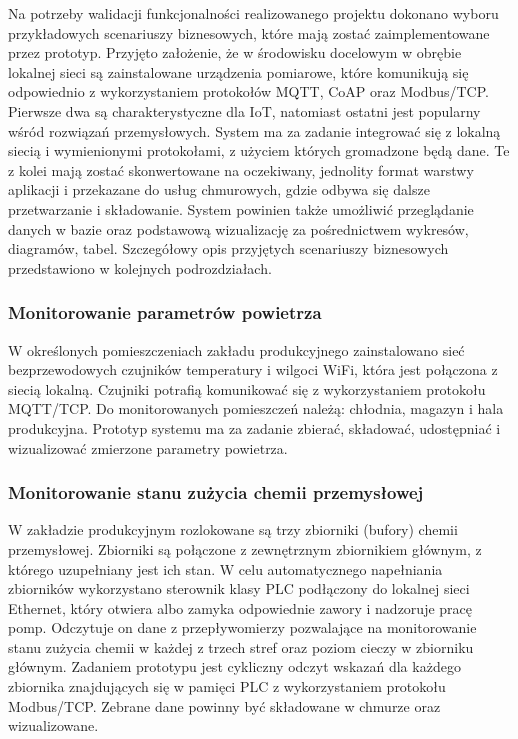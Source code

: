 \documentclass[a4paper, 12pt, twoside]{article}
\begin{document}
Na potrzeby walidacji funkcjonalności realizowanego projektu dokonano wyboru przykładowych
scenariuszy biznesowych, które mają zostać zaimplementowane przez prototyp.
Przyjęto założenie, że w środowisku docelowym w obrębie lokalnej sieci
są zainstalowane urządzenia pomiarowe, które komunikują się odpowiednio
z wykorzystaniem protokołów
MQTT, CoAP oraz Modbus/TCP. Pierwsze dwa są charakterystyczne dla IoT, natomiast
ostatni jest popularny wśród rozwiązań przemysłowych. System ma za zadanie
integrować się z lokalną siecią i wymienionymi protokołami, z użyciem
których gromadzone będą dane. Te z kolei mają zostać skonwertowane na oczekiwany,
jednolity format warstwy aplikacji i przekazane do usług chmurowych, gdzie odbywa się dalsze
przetwarzanie i składowanie. System powinien także umożliwić przeglądanie danych
w bazie oraz podstawową wizualizację za pośrednictwem wykresów, diagramów, tabel.
Szczegółowy opis przyjętych scenariuszy biznesowych przedstawiono w kolejnych
podrozdziałach.

\subsubsection{Monitorowanie parametrów powietrza}

W określonych pomieszczeniach zakładu produkcyjnego zainstalowano sieć bezprzewodowych
czujników temperatury i wilgoci WiFi, która jest połączona z siecią lokalną.
Czujniki potrafią komunikować się z wykorzystaniem protokołu MQTT/TCP. Do monitorowanych
pomieszczeń należą: chłodnia, magazyn i hala produkcyjna. Prototyp systemu ma za zadanie
zbierać, składować, udostępniać i wizualizować zmierzone parametry powietrza.

\subsubsection{Monitorowanie stanu zużycia chemii przemysłowej}

W zakładzie produkcyjnym rozlokowane są trzy zbiorniki (bufory) chemii przemysłowej.
Zbiorniki są połączone z zewnętrznym zbiornikiem głównym, z którego uzupełniany
jest ich stan. W celu automatycznego napełniania zbiorników wykorzystano sterownik
klasy PLC podłączony do lokalnej sieci Ethernet, który otwiera albo zamyka
odpowiednie zawory i nadzoruje pracę pomp.
Odczytuje on dane z przepływomierzy pozwalające na monitorowanie stanu
zużycia chemii w każdej z trzech stref oraz poziom cieczy w zbiorniku głównym.
Zadaniem prototypu jest cykliczny odczyt wskazań dla każdego
zbiornika znajdujących się w pamięci PLC z wykorzystaniem protokołu Modbus/TCP.
Zebrane dane powinny być składowane w chmurze oraz wizualizowane.
\end{document}
